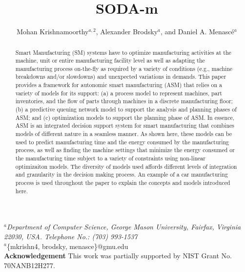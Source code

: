 \documentclass[a4paper, 12pt]{article} %
\title{\textbf{SODA-m}} %
\author{Mohan Krishnamoorthy$^{a,2}$, Alexander Brodsky$^a$, and Daniel A. Menasc\'e$^{a}$} %
\makeatletter
\renewcommand{\maketitle}{ %
\begin{flushleft} 
{\large\@title\footnotemark[1]} %

\vspace{20pt} %

{\large\@author} %
\end{flushleft}
}
\makeatother
\begin{document}
\maketitle %

\begin{flushleft} 
\vspace{10pt}
$^a$\textit{Department of Computer Science, George Mason University, Fairfax, Virginia 22030, USA. Telephone No.: (703) 993-1537}\\
\vspace{20pt}
$^a$\{mkrishn4, brodsky, menasce\}@gmu.edu \\
\vspace{20pt}
\textbf{Acknowledgement}\newline
This work was partially supported by NIST Grant No. 70NANB12H277. \newline
\vspace{20pt}
\end{flushleft} 

\newpage
{\large \@title }
\vspace{10pt}


\begin{abstract}{\small\noindent
Smart Manufacturing (SM) systems have to optimize  manufacturing activities at the machine, unit or entire manufacturing facility level  as well as adapting the manufacturing process on-the-fly as required by a variety of conditions (e.g., machine breakdowns and/or slowdowns) and unexpected variations in demands. This paper provides a framework for autonomic smart manufacturing (ASM) that relies on a variety of models for its support: (a) a process model to represent machines, part inventories, and the flow of parts through machines in a discrete manufacturing floor; (b) a predictive queuing network model to support the analysis and planning phases of  ASM; and (c) optimization models to support the planning phase of ASM. In essence, ASM is an integrated decision support system for smart manufacturing that combines models of different nature  in a seamless manner. As shown here, these models can be used to predict manufacturing time and the energy consumed by the manufacturing process, as well as finding the machine settings that minimize the energy consumed or the manufacturing time subject to a variety of constraints using non-linear optimizaiton models. The diversity of models used affords different levels of integration and granularity in the decision making process. An example of a car manufacturing process is used throughout the paper to explain the concepts and models introduced here.}
\end{abstract}
\end{document}
